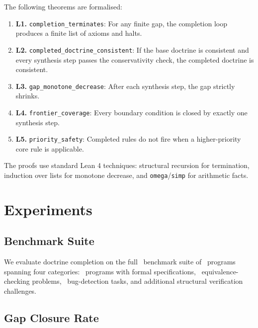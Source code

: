 \documentclass[11pt]{article}
\begin{document}
The following theorems are formalised:

\begin{enumerate}[leftmargin=2em,label=\textbf{L\arabic*.}]
  \item \textbf{L1.} \texttt{completion\_terminates}: For any
        finite gap, the completion loop produces a finite list of
        axioms and halts.
  \item \textbf{L2.} \texttt{completed\_doctrine\_consistent}: If the
        base doctrine is consistent and every synthesis step passes the
        conservativity check, the completed doctrine is consistent.
  \item \textbf{L3.} \texttt{gap\_monotone\_decrease}: After each
        synthesis step, the gap strictly shrinks.
  \item \textbf{L4.} \texttt{frontier\_coverage}: Every boundary
        condition is closed by exactly one synthesis step.
  \item \textbf{L5.} \texttt{priority\_safety}: Completed rules do not
        fire when a higher-priority core rule is applicable.
\end{enumerate}

The proofs use standard Lean 4 techniques: structural recursion for
termination, induction over lists for monotone decrease, and
\texttt{omega}/\texttt{simp} for arithmetic facts.

\section{Experiments}\label{sec:experiments}

\subsection{Benchmark Suite}

We evaluate doctrine completion on the full \JuGeo\ benchmark suite
of \numcases\ programs spanning four categories:
\numspec\ programs with formal specifications,
\numeq\ equivalence-checking problems,
\numbug\ bug-detection tasks, and
additional structural verification challenges.

\subsection{Gap Closure Rate}
\end{document}
